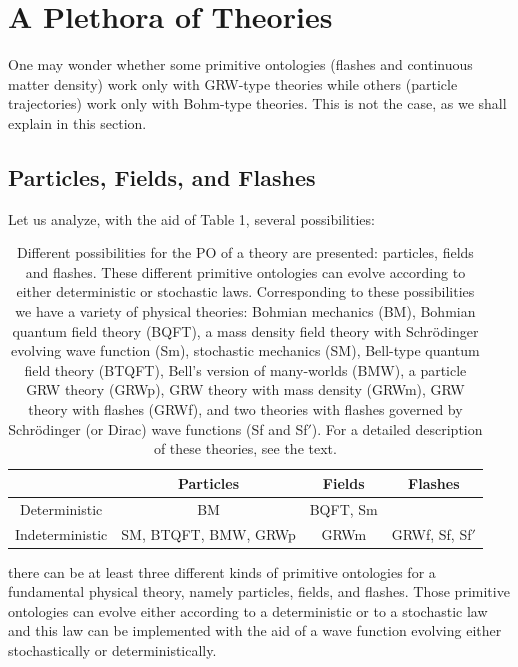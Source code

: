 \documentclass[12pt]{article}
\begin{document}
\section{A Plethora of Theories}
\label{sec:differences}
One may  wonder whether some primitive ontologies (flashes and
continuous matter density) work only with {\sf GRW}-type theories while others
(particle trajectories) work only with Bohm-type theories. This is  
not the case, as we shall explain in  this section.

\subsection{Particles, Fields, and Flashes}

Let us analyze, with the aid of Table 1, several possibilities:
\begin{table}[t!]
\begin{center}
\begin{tabular}{|c||c|c|c|}\hline  & Particles & Fields & Flashes \\\hline\hline Deterministic & {\sf BM} & {\sf BQFT}, {\sf Sm} &  \\\hline Indeterministic & {\sf SM}, {\sf BTQFT}, {\sf BMW}, {\sf GRWp} & 
{\sf GRWm} &  {\sf GRWf}, {\sf Sf}, {\sf Sf$'$} \\\hline \end{tabular} \caption{\small{Different possibilities for the PO of a theory are presented: particles, fields and flashes. These different primitive ontologies can evolve according to either deterministic or stochastic laws.  
Corresponding to these possibilities we have a variety of physical theories: Bohmian mechanics ({\sf BM}), Bohmian quantum field theory ({\sf BQFT}),   a mass density field theory with Schr\"odinger evolving wave function ({\sf Sm}), stochastic mechanics ({\sf SM}), Bell-type quantum field theory ({\sf BTQFT}), Bell's version of many-worlds ({\sf BMW}), a particle {\sf GRW} theory ({\sf GRWp}),
{\sf GRW} theory with mass density ({\sf GRWm}), {\sf GRW} theory with flashes ({\sf GRWf}), 
and two theories with flashes governed by Schr\"odinger (or Dirac) wave functions ({\sf Sf} and {\sf Sf$'$}).  For a detailed description of these theories, see the text.}}
\end{center}
\label{defaulttable}
\end{table}
there can be at least three different kinds of primitive ontologies for a fundamental physical theory, namely particles, fields, and flashes. Those primitive ontologies can evolve either according to a deterministic or to a stochastic law and this law can be implemented with the aid of a wave function evolving either stochastically or deterministically.
\end{document}
